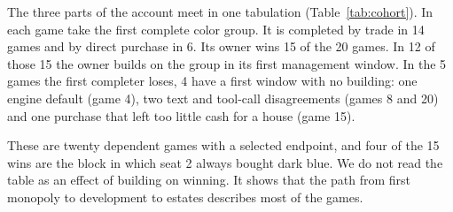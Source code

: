 The three parts of the account meet in one tabulation (Table~\ref{tab:cohort}). In each game take the first complete color group. It is completed by trade in 14 games and by direct purchase in 6. Its owner wins 15 of the 20 games. In 12 of those 15 the owner builds on the group in its first management window. In the 5 games the first completer loses, 4 have a first window with no building: one engine default (game 4), two text and tool-call disagreements (games 8 and 20) and one purchase that left too little cash for a house (game 15).

These are twenty dependent games with a selected endpoint, and four of the 15 wins are the block in which seat 2 always bought dark blue. We do not read the table as an effect of building on winning. It shows that the path from first monopoly to development to estates describes most of the games.
